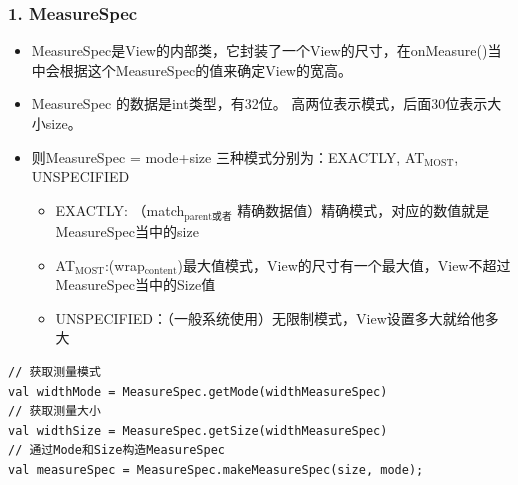 \documentclass[9pt, b5paper]{article}
\begin{document}
\subsubsection{1. MeasureSpec}
\label{sec-1-4-1}
\begin{itemize}
\item MeasureSpec是View的内部类，它封装了一个View的尺寸，在onMeasure()当中会根据这个MeasureSpec的值来确定View的宽高。
\item MeasureSpec 的数据是int类型，有32位。 高两位表示模式，后面30位表示大小size。
\item 则MeasureSpec = mode+size 三种模式分别为：EXACTLY, AT$_{\text{MOST}}$, UNSPECIFIED
\begin{itemize}
\item EXACTLY: （match$_{\text{parent或者}}$ 精确数据值）精确模式，对应的数值就是MeasureSpec当中的size
\item AT$_{\text{MOST}}$:(wrap$_{\text{content}}$)最大值模式，View的尺寸有一个最大值，View不超过MeasureSpec当中的Size值
\item UNSPECIFIED：（一般系统使用）无限制模式，View设置多大就给他多大
\end{itemize}
\end{itemize}
\begin{verbatim}
// 获取测量模式
val widthMode = MeasureSpec.getMode(widthMeasureSpec)
// 获取测量大小 
val widthSize = MeasureSpec.getSize(widthMeasureSpec)
// 通过Mode和Size构造MeasureSpec
val measureSpec = MeasureSpec.makeMeasureSpec(size, mode);
\end{verbatim}
\end{document}
